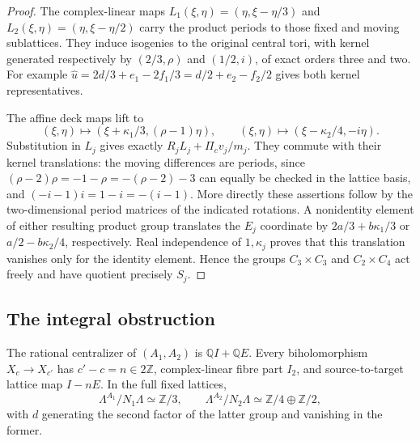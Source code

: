 \begin{proof}
The complex-linear maps $L_1(\xi,\eta)=(\eta,\xi-\eta/3)$ and $L_2(\xi,\eta)=(\eta,\xi-\eta/2)$ carry the product periods to those fixed and moving sublattices. They induce isogenies to the original central tori, with kernel generated respectively by $(2/3,\rho)$ and $(1/2,i)$, of exact orders three and two. For example $\widehat u=2d/3+e_1-2f_1/3=d/2+e_2-f_2/2$ gives both kernel representatives.

The affine deck maps lift to
\[
 (\xi,\eta)\longmapsto(\xi+\kappa_1/3,(\rho-1)\eta),\qquad
 (\xi,\eta)\longmapsto(\xi-\kappa_2/4,-i\eta).
\]
Substitution in $L_j$ gives exactly $R_jL_j+\Pi_cv_j/m_j$. They commute with their kernel translations: the moving differences are periods, since $(\rho-2)\rho=-1-\rho=-(\rho-2)-3$ can equally be checked in the lattice basis, and $(-i-1)i=1-i=-(i-1)$. More directly these assertions follow by the two-dimensional period matrices of the indicated rotations. A nonidentity element of either resulting product group translates the $E_j$ coordinate by $2a/3+b\kappa_1/3$ or $a/2-b\kappa_2/4$, respectively. Real independence of $1,\kappa_j$ proves that this translation vanishes only for the identity element. Hence the groups $C_3\times C_3$ and $C_2\times C_4$ act freely and have quotient precisely $S_j$.
\end{proof}

\subsection{The integral obstruction}\label{fam:section:A.2}

\begin{proposition}\label{fam:src:A.2.1}\label{fam:st:A.2.1}
The rational centralizer of $(A_1,A_2)$ is $\mathbb QI+\mathbb QE$. Every biholomorphism $X_c\to X_{c'}$ has $c'-c=n\in2\mathbb Z$, complex-linear fibre part $I_2$, and source-to-target lattice map $I-nE$. In the full fixed lattices,
\[
 \Lambda^{A_1}/N_1\Lambda\simeq\mathbb Z/3,\qquad
 \Lambda^{A_2}/N_2\Lambda\simeq\mathbb Z/4\oplus\mathbb Z/2,
\]
with $d$ generating the second factor of the latter group and vanishing in the former.
\end{proposition}

